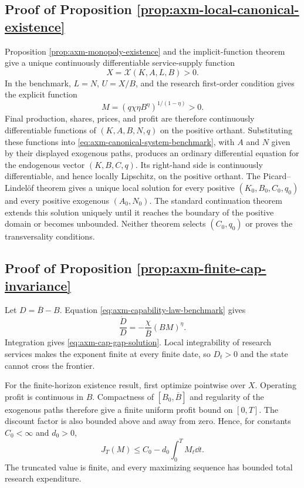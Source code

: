 \subsection{Proof of Proposition \ref{prop:axm-local-canonical-existence}}

Proposition \ref{prop:axm-monopoly-existence} and the implicit-function theorem
give a unique continuously differentiable service-supply function
\[
 X=\mathcal X(K,A,L,B)>0.
\]
In the benchmark, \(L=N\), \(U=X/B\), and the research first-order condition
gives the explicit function
\[
 M=(q\chi\eta B^\eta)^{1/(1-\eta)}>0.
\]
Final production, shares, prices, and profit are therefore continuously
differentiable functions of \((K,A,B,N,q)\) on the positive orthant. Substituting
these functions into \eqref{eq:axm-canonical-system-benchmark}, with \(A\) and
\(N\) given by their displayed exogenous paths, produces an ordinary
differential equation for the endogenous vector \((K,B,C,q)\). Its right-hand
side is continuously differentiable, and hence locally Lipschitz, on the
positive orthant. The Picard--Lindel\"of theorem gives a unique local solution
for every positive \((K_0,B_0,C_0,q_0)\) and every positive exogenous
\((A_0,N_0)\). The standard continuation theorem
extends this solution uniquely until it reaches the boundary of the positive
domain or becomes unbounded. Neither theorem selects \((C_0,q_0)\) or proves
the transversality conditions.

\subsection{Proof of Proposition \ref{prop:axm-finite-cap-invariance}}

Let \(D=\overline B-B\). Equation
\eqref{eq:axm-capability-law-benchmark} gives
\[
 \frac{\dot D}{D}=-\frac{\chi}{\overline B}(BM)^\eta.
\]
Integration gives \eqref{eq:axm-cap-gap-solution}. Local integrability of
research services makes the exponent finite at every finite date, so
\(D_t>0\) and the state cannot cross the frontier.

For the finite-horizon existence result, first optimize pointwise over \(X\).
Operating profit is continuous in \(B\). Compactness of
\([B_0,\overline B]\) and regularity of the exogenous paths therefore give a
finite uniform profit bound on \([0,T]\). The discount factor is also bounded
above and away from zero. Hence, for constants \(C_0<\infty\) and
\(d_0>0\),
\[
 J_T(M)\leq C_0-d_0\int_0^T M_t\dd t.
\]
The truncated value is finite, and every maximizing sequence has bounded total
research expenditure.

